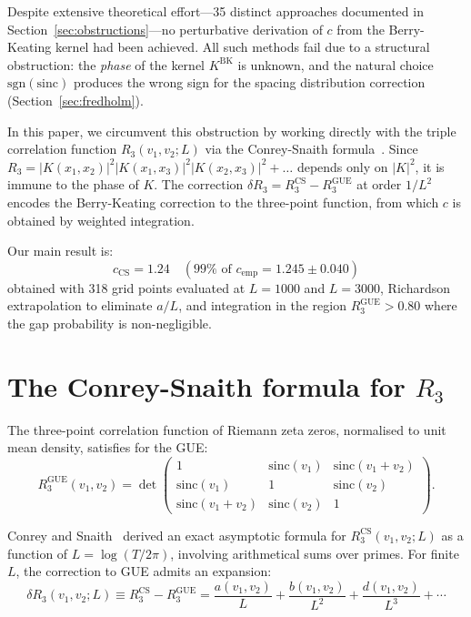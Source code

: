 \documentclass[11pt]{article}
\begin{document}
Despite extensive theoretical effort---35 distinct approaches documented in
Section~\ref{sec:obstructions}---no perturbative derivation of $c$ from the
Berry-Keating kernel had been achieved. All such methods fail due to a
structural obstruction: the \emph{phase} of the kernel $K^{\mathrm{BK}}$
is unknown, and the natural choice $\mathrm{sgn}(\mathrm{sinc})$ produces
the wrong sign for the spacing distribution correction
(Section~\ref{sec:fredholm}).

In this paper, we circumvent this obstruction by working directly with the
triple correlation function $R_3(v_1, v_2; L)$ via the Conrey-Snaith
formula~\cite{conrey2005, conreysnaith2008}. Since
$R_3 = |K(x_1,x_2)|^2 |K(x_1,x_3)|^2 |K(x_2,x_3)|^2 + \ldots$ depends
only on $|K|^2$, it is immune to the phase of $K$. The correction
$\delta R_3 = R_3^{\mathrm{CS}} - R_3^{\mathrm{GUE}}$ at order $1/L^2$
encodes the Berry-Keating correction to the three-point function, from which
$c$ is obtained by weighted integration.

Our main result is:
\begin{equation}
\boxed{c_{\mathrm{CS}} = 1.24 \quad (99\% \text{ of } c_{\mathrm{emp}} = 1.245 \pm 0.040)}
\label{eq:main}
\end{equation}
obtained with 318 grid points evaluated at $L = 1000$ and $L = 3000$,
Richardson extrapolation to eliminate $a/L$, and integration in the region
$R_3^{\mathrm{GUE}} > 0.80$ where the gap probability is non-negligible.


\section{The Conrey-Snaith formula for $R_3$}

The three-point correlation function of Riemann zeta zeros, normalised to
unit mean density, satisfies for the GUE:
\begin{equation}
R_3^{\mathrm{GUE}}(v_1, v_2) = \det\begin{pmatrix}
1 & \mathrm{sinc}(v_1) & \mathrm{sinc}(v_1{+}v_2) \\
\mathrm{sinc}(v_1) & 1 & \mathrm{sinc}(v_2) \\
\mathrm{sinc}(v_1{+}v_2) & \mathrm{sinc}(v_2) & 1
\end{pmatrix}.
\label{eq:R3GUE}
\end{equation}

Conrey and Snaith~\cite{conrey2005, conreysnaith2008} derived an exact
asymptotic formula for $R_3^{\mathrm{CS}}(v_1, v_2; L)$ as a function of
$L = \log(T/2\pi)$, involving arithmetical sums over primes. For finite $L$,
the correction to GUE admits an expansion:
\begin{equation}
\delta R_3(v_1, v_2; L) \equiv R_3^{\mathrm{CS}} - R_3^{\mathrm{GUE}}
= \frac{a(v_1, v_2)}{L} + \frac{b(v_1, v_2)}{L^2} + \frac{d(v_1, v_2)}{L^3} + \cdots
\label{eq:expansion}
\end{equation}
\end{document}
